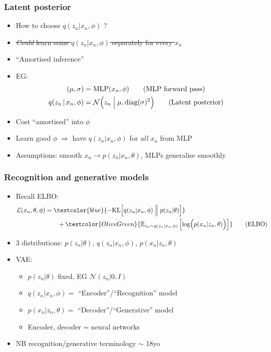 \documentclass[xcolor=table,dvipsnames]{beamer}
\begin{document}
\begin{frame}[t]
    \frametitle{Latent posterior}
    \begin{itemize}
        \setlength{\itemsep}{1em}
        \item How to choose $q(z_n \vert x_n, \phi)$ ?
        \item \sout{\emph{Could} learn some $q(z_n \vert x_n, \phi)$ separately for every $x_n$}
        \item ``Amortised inference'' \Smiley
        \item EG:
        \begin{align*}
            (\mu, \sigma) &= \text{MLP}(x_n, \phi) \tag{MLP forward pass} \\
            q(z_n \,\vert\, x_n, \phi) &= \mathcal{N}\Bigl( z_n \Bigm\vert \mu, \text{diag}(\sigma)^2 \Bigr) \tag{Latent posterior}
        \end{align*}
        \item Cost ``amortised'' into $\phi$
        \item Learn good $\phi\;\Rightarrow$ have $q(z_n \vert x_n, \phi)$ for \emph{all} $x_n$ from MLP
        \item Assumptions: smooth $x_n \rightarrow p(z_n | x_n,\theta)$, MLPs generalise smoothly
    \end{itemize}
\end{frame}

\begin{frame}
    \frametitle{Recognition and generative models}
    \begin{itemize}
        \setlength{\itemsep}{0.5em}
        \item Recall ELBO:
        \begin{align*}
            \mathcal{L}(x_n, \theta, \phi) &= \textcolor{blue}{{-\text{KL}\Bigl[q(z_n \vert x_n, \phi) \Bigm\Vert p(z_n \vert \theta)\Bigr]}} \\
            &\qquad + \textcolor{OliveGreen}{\mathbb{E}_{z_n\sim q(z_n \vert x_n, \phi)}\left[ \log \Bigl(p(x_n \vert z_n, \theta)\Bigr) \right]} \tag{ELBO}
        \end{align*}
        \item 3 distributions: $p(z_n \vert \theta)$, $q(z_n \vert x_n, \phi)$, $p(x_n \vert z_n, \theta)$
        \item VAE:
        \begin{itemize}
            \setlength{\itemsep}{0.5em}
            \vspace{0.5em}
            \item $p(z_n \vert \theta)$ fixed, EG $\mathcal{N}(z_n | 0, I)$
            \item $q(z_n \vert x_n, \phi) =$ ``Encoder''/``Recognition'' model
            \item $p(x_n \vert z_n, \theta) =$ ``Decoder''/``Generative'' model
            \item Encoder, decoder = neural networks
        \end{itemize}
        \item NB recognition/generative terminology $\sim$ 18yo \cite{hinton1995wake}
    \end{itemize}
\end{frame}
\end{document}
